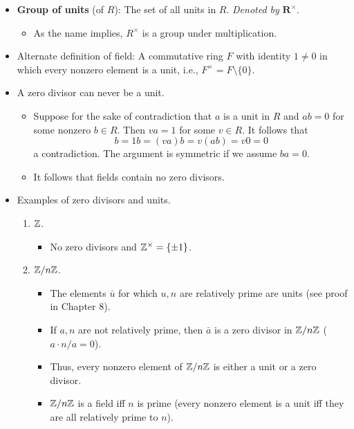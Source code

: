 \documentclass[../notes.tex]{subfiles}
\begin{document}
\begin{itemize}
\begin{itemize}
    \end{itemize}
    \item \textbf{Group of units} (of $R$): The set of all units in $R$. \emph{Denoted by} $\bm{R^\times}$.
    \begin{itemize}
        \item As the name implies, $R^\times$ is a group under multiplication.
    \end{itemize}
    \item Alternate definition of field: A commutative ring $F$ with identity $1\neq 0$ in which every nonzero element is a unit, i.e., $F^\times=F\setminus\{0\}$.
    \item A zero divisor can never be a unit.
    \begin{itemize}
        \item Suppose for the sake of contradiction that $a$ is a unit in $R$ and $ab=0$ for some nonzero $b\in R$. Then $va=1$ for some $v\in R$. It follows that
        \begin{equation*}
            b = 1b = (va)b = v(ab) = v0 = 0
        \end{equation*}
        a contradiction. The argument is symmetric if we assume $ba=0$.
        \item It follows that fields contain no zero divisors.
    \end{itemize}
    \item Examples of zero divisors and units.
    \begin{enumerate}
        \item $\mathbb{Z}$.
        \begin{itemize}
            \item No zero divisors and $\mathbb{Z}^\times=\{\pm 1\}$.
        \end{itemize}
        \item $\mathbb{Z}/n\mathbb{Z}$.
        \begin{itemize}
            \item The elements $\bar{u}$ for which $u,n$ are relatively prime are units (see proof in Chapter 8).
            \item If $a,n$ are not relatively prime, then $\bar{a}$ is a zero divisor in $\mathbb{Z}/n\mathbb{Z}$ ($a\cdot n/a=0$).
            \item Thus, every nonzero element of $\mathbb{Z}/n\mathbb{Z}$ is either a unit or a zero divisor.
            \item $\mathbb{Z}/n\mathbb{Z}$ is a field iff $n$ is prime (every nonzero element is a unit iff they are all relatively prime to $n$).
        \end{itemize}

\end{enumerate}
\end{itemize}
\end{document}
